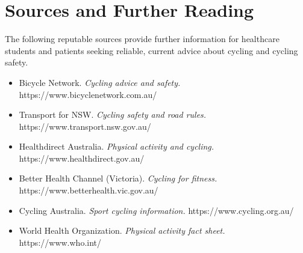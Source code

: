\section*{Sources and Further Reading}
The following reputable sources provide further information for healthcare students and patients seeking reliable, current advice about cycling and cycling safety.

\begin{itemize}
    \item Bicycle Network. \textit{Cycling advice and safety.} https://www.bicyclenetwork.com.au/
    \item Transport for NSW. \textit{Cycling safety and road rules.} https://www.transport.nsw.gov.au/
    \item Healthdirect Australia. \textit{Physical activity and cycling.} https://www.healthdirect.gov.au/
    \item Better Health Channel (Victoria). \textit{Cycling for fitness.} https://www.betterhealth.vic.gov.au/
    \item Cycling Australia. \textit{Sport cycling information.} https://www.cycling.org.au/
    \item World Health Organization. \textit{Physical activity fact sheet.} https://www.who.int/
\end{itemize}
